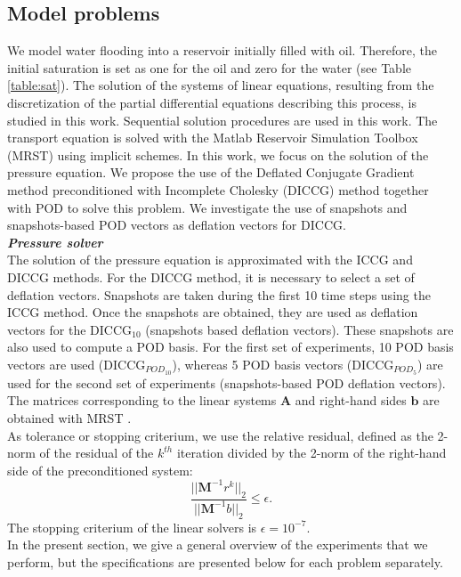 \documentclass[12pt]{article}
\begin{document}
\subsection{Model problems}\label{modpro}
\hspace{0.5cm} We model water flooding into a reservoir initially filled with oil. Therefore, the initial saturation is set as one for the oil and zero for the water (see Table \ref{table:sat}). 
The solution of the systems of linear equations, resulting from the discretization of the partial differential equations describing this process, is studied in this work. Sequential solution procedures are used in this work. The transport equation is solved with the Matlab Reservoir Simulation Toolbox (MRST) \cite{Lie13} using implicit schemes.
In this work, we focus on the solution of the pressure equation. We propose the use of the Deflated Conjugate Gradient method preconditioned with Incomplete Cholesky (DICCG) method together with POD to solve this problem. We investigate the use of snapshots and snapshots-based POD vectors as deflation vectors for DICCG.\\
\emph{\textbf{Pressure solver}}\\
The solution of the pressure equation is approximated with the ICCG and DICCG methods. 
For the DICCG method, it is necessary to select a set of deflation vectors. Snapshots are taken during the first 10 time steps using the ICCG method. Once the snapshots are obtained, they are used as deflation vectors for the DICCG$_{10}$ (snapshots based deflation vectors). These snapshots are also used to compute a POD basis. For the first set of experiments, 10 POD basis vectors are used (DICCG$_{POD_{10}}$), whereas 5 POD basis vectors (DICCG$_{POD_{5}}$) are used for the second set of experiments (snapshots-based POD deflation vectors). The matrices corresponding to the linear systems $\mathbf{A}$ and right-hand sides $\mathbf{b}$ are obtained with MRST \cite{Lie13}. \\
As tolerance or stopping criterium, we use the relative residual, defined as the 2-norm of the residual of the $k^{th}$ iteration divided by 
the 2-norm of the right-hand side of the preconditioned system: 
$$\frac{||\mathbf{M}^{-1}r^k||_2}{||\mathbf{M}^{-1}b||_2}\leq \epsilon.$$
The stopping criterium of the linear solvers is $\epsilon=10^{-7}$. \\
In the present section, we give a general overview of the experiments that we perform, but the specifications are presented below for each problem separately. 
\end{document}
